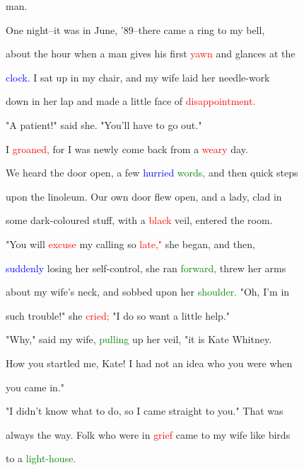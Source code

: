  man.



 One night--it was in June, '89--there came a ring to my bell,

 about the hour when a man gives his first \textcolor{red}{yawn} and glances at the

 \textcolor{blue}{clock.} I sat up in my chair, and my wife laid her needle-work

 down in her lap and made a little face of \textcolor{red}{disappointment.}



 "A \textcolor{BurntOrange}{patient!"} said she. "You'll have to go out."



 I \textcolor{red}{groaned,} for I was newly come back from a \textcolor{red}{weary} day.



 We heard the door open, a few \textcolor{blue}{hurried} \textcolor{green}{words,} and then quick steps

 upon the linoleum. Our own door flew open, and a lady, clad in

 some dark-coloured stuff, with a \textcolor{red}{black} veil, entered the room.



 "You will \textcolor{red}{excuse} my calling so \textcolor{red}{late,"} she began, and then,

 \textcolor{blue}{suddenly} \textcolor{BurntOrange}{losing} her self-control, she ran \textcolor{green}{forward,} threw her arms

 about my wife's neck, and sobbed upon her \textcolor{green}{shoulder.} "Oh, I'm in

 such trouble!" she \textcolor{red}{cried;} "I do so want a little help."



 "Why," said my wife, \textcolor{green}{pulling} up her veil, "it is Kate Whitney.

 How you \textcolor{BurntOrange}{startled} me, Kate! I had not an idea who you were when

 you came in."



 "I didn't know what to do, so I came straight to you." That was

 always the way. Folk who were in \textcolor{red}{grief} came to my wife like birds

 to a \textcolor{green}{light-house.}



